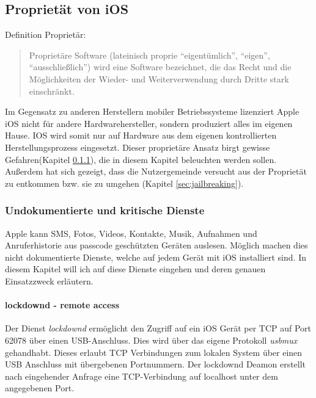 \subsection{Proprietät von iOS}\label{sec:proprietaer-ios}
	Definition Proprietär:
	\begin{quote}
		Proprietäre Software (lateinisch proprie "`eigentümlich"', "`eigen"',
		"`ausschließlich"') wird eine Software bezeichnet, die das Recht und die
		Möglichkeiten der Wieder- und Weiterverwendung durch Dritte stark einschränkt.
		\cite{WikiProprietary2015}
	\end{quote}
	Im Gegensatz zu anderen Herstellern mobiler Betriebssysteme lizenziert Apple
	iOS nicht für andere Hardwarehersteller, sondern produziert alles im
	eigenen Hause. IOS wird somit nur auf Hardware aus dem eigenen kontrollierten
	Herstellungsprozess eingesetzt. Dieser proprietäre Ansatz birgt gewisse
	Gefahren(Kapitel
	\ref{sec:undocumented-services}), die in diesem Kapitel beleuchten werden
	sollen. Außerdem hat sich gezeigt, dass die Nutzergemeinde versucht aus der
	Proprietät zu entkommen bzw. sie zu umgehen (Kapitel \ref{sec:jailbreaking}).
	
	\subsubsection{Undokumentierte und kritische
	Dienste}\label{sec:undocumented-services}
		Apple kann SMS, Fotos, Videos, Kontakte, Musik, Aufnahmen und Anruferhistorie
		aus passcode geschützten Geräten auslesen. Möglich machen dies nicht
		dokumentierte Dienste, welche auf jedem Gerät mit iOS installiert sind. In
		diesem Kapitel will ich auf diese Dienste eingehen und deren genauen
		Einsatzzweck erläutern.
		\paragraph{lockdownd - remote access}
			Der Dienst \textsl{lockdownd} ermöglicht den Zugriff auf ein iOS Gerät
			per TCP auf Port 62078 über einen USB-Anschluss.
			Dies wird über das eigene Protokoll \textsl{usbmux} gehandhabt. Dieses
			erlaubt TCP Verbindungen zum lokalen System über einen USB Anschluss mit
			übergebenen	Portnummern. Der lockdownd Deamon erstellt nach eingehender
			Anfrage eine TCP-Verbindung auf localhost unter dem angegebenen Port.
